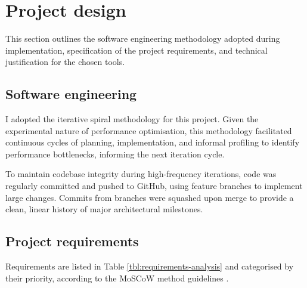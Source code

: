 \section{Project design} \label{prep:design}

This section outlines the software engineering methodology adopted during implementation, specification of the 
project requirements, and technical justification for the chosen tools.

\subsection{Software engineering}

I adopted the iterative spiral methodology for this project. Given the experimental nature of performance optimisation, 
this methodology facilitated continuous cycles of planning, implementation, and informal profiling to identify performance 
bottlenecks, informing the next iteration cycle.

To maintain codebase integrity during high-frequency iterations, code was regularly committed and pushed to GitHub,
using feature branches to implement large changes. Commits from branches were squashed upon merge to provide a clean, 
linear history of major architectural milestones.

\subsection{Project requirements}


Requirements are listed in Table \ref{tbl:requirements-analysis}
and categorised by their priority, according to the MoSCoW method guidelines \cite{moscow}.

